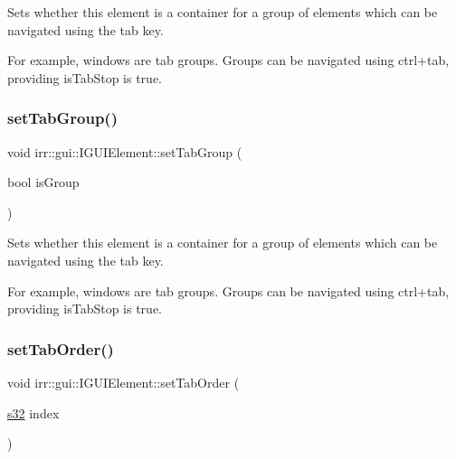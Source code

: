 Sets whether this element is a container for a group of elements which can be navigated using the tab key. 

For example, windows are tab groups. Groups can be navigated using ctrl+tab, providing is\+Tab\+Stop is true. \mbox{\label{classirr_1_1gui_1_1IGUIElement_aa44a46f3b639ca1b095f855c9d9c959d}} 
\subsubsection{\texorpdfstring{set\+Tab\+Group()}{setTabGroup()}\hspace{0.1cm}{\footnotesize\ttfamily [2/2]}}
{\footnotesize\ttfamily void irr\+::gui\+::\+I\+G\+U\+I\+Element\+::set\+Tab\+Group (\begin{DoxyParamCaption}\item[{bool}]{is\+Group }\end{DoxyParamCaption})\hspace{0.3cm}{\ttfamily [inline]}}



Sets whether this element is a container for a group of elements which can be navigated using the tab key. 

For example, windows are tab groups. Groups can be navigated using ctrl+tab, providing is\+Tab\+Stop is true. \mbox{\label{classirr_1_1gui_1_1IGUIElement_a1aabac2cce7847e5ab17f6c88d129ef7}} 
\subsubsection{\texorpdfstring{set\+Tab\+Order()}{setTabOrder()}\hspace{0.1cm}{\footnotesize\ttfamily [1/2]}}
{\footnotesize\ttfamily void irr\+::gui\+::\+I\+G\+U\+I\+Element\+::set\+Tab\+Order (\begin{DoxyParamCaption}\item[{\hyperlink{namespaceirr_ac66849b7a6ed16e30ebede579f9b47c6}{s32}}]{index }\end{DoxyParamCaption})\hspace{0.3cm}{\ttfamily [inline]}}



